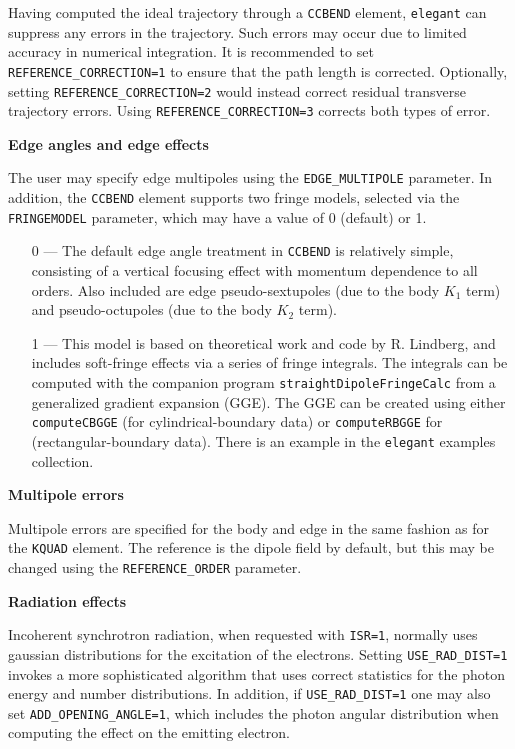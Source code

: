 Having computed the ideal trajectory through a \verb|CCBEND| element, {\tt elegant}
can suppress any errors in the trajectory. Such errors may occur due to
limited accuracy in numerical integration. It is recommended to
set \verb|REFERENCE_CORRECTION=1| to ensure that the path length is corrected.
Optionally, setting \verb|REFERENCE_CORRECTION=2| would instead correct
residual transverse trajectory errors. Using \verb|REFERENCE_CORRECTION=3| corrects
both types of error.

{\bf Edge angles and edge effects} 

The user may specify edge multipoles using the \verb|EDGE_MULTIPOLE| parameter. In addition, 
the \verb|CCBEND| element supports two fringe models, selected via the \verb|FRINGEMODEL| parameter, 
which may have a value of 0 (default) or 1.
\begin{itemize}
\item[0] --- The default edge angle treatment in \verb|CCBEND| is relatively simple, consisting of a 
vertical focusing effect with momentum dependence to all orders.
Also included are edge pseudo-sextupoles (due to the body $K_1$ term) and
pseudo-octupoles (due to the body $K_2$ term).
\item[1] --- This model is based on theoretical work and code by R. Lindberg, and includes soft-fringe
  effects via a series of fringe integrals. The integrals can be computed with the companion program
  \verb|straightDipoleFringeCalc| from a generalized gradient expansion (GGE). The  GGE can be
  created using either \verb|computeCBGGE| (for cylindrical-boundary data) or \verb|computeRBGGE|
  for (rectangular-boundary data). There is an example in the {\tt elegant} examples collection.
\end{itemize}

{\bf Multipole errors}

Multipole errors are specified for the body and edge in the same fashion as for the
\verb|KQUAD| element.
The reference is the dipole field by default, but this may be changed using the
\verb|REFERENCE_ORDER| parameter.

{\bf Radiation effects}

Incoherent synchrotron radiation, when requested with {\tt ISR=1},
normally uses gaussian distributions for the excitation of the electrons.
Setting {\tt USE\_RAD\_DIST=1} invokes a more sophisticated algorithm that
uses correct statistics for the photon energy and number distributions.
In addition, if {\tt USE\_RAD\_DIST=1} one may also set {\tt ADD\_OPENING\_ANGLE=1},
which includes the photon angular distribution when computing the effect on 
the emitting electron.  

